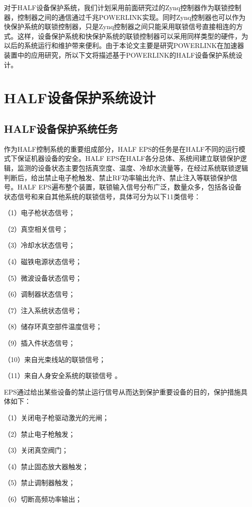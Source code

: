 对于HALF设备保护系统，我们计划采用前面研究过的Zynq控制器作为联锁控制器，控制器之间的通信通过千兆POWERLINK实现。同时Zynq控制器也可以作为快保护系统的联锁控制器，只是Zynq控制器之间只能采用联锁信号直接相连的方式。这样，设备保护系统和快保护系统的联锁控制器可以采用同样类型的硬件，为以后的系统运行和维护带来便利。由于本论文主要是研究POWERLINK在加速器装置中的应用研究，所以下文将描述基于POWERLINK的HALF设备保护系统设计。


\section{HALF设备保护系统设计}

\subsection{HALF设备保护系统任务}

作为HALF控制系统的重要组成部分，HALF EPS的任务是在HALF不同的运行模式下保证机器设备的安全。HALF EPS在HALF各分总体、系统间建立联锁保护逻辑，监测的设备状态主要包括真空度、温度、冷却水流量等，在经过系统联锁逻辑判断后，给出禁止电子枪触发、禁止RF功率输出允许、禁止注入等联锁保护信号。HALF EPS遍布整个装置，联锁输入信号分布广泛，数量众多，包括各设备状态信号和来自其他系统的联锁信号，具体可分为以下11类信号：

（1）电子枪状态信号；

（2）真空相关信号；

（3）冷却水状态信号；

（4）磁铁电源状态信号；

（5）微波设备状态信号；

（6）调制器状态信号；

（7）注入系统状态信号；

（8）储存环真空部件温度信号；

（9）插入件状态信号；

（10）来自光束线站的联锁信号；

（11）来自人身安全系统的联锁信号 。


EPS通过给出某些设备的禁止运行信号从而达到保护重要设备的目的，保护措施具体如下：

（1）关闭电子枪驱动激光的光闸；

（2）禁止电子枪触发；

（3）关闭真空阀门；

（4）禁止固态放大器触发；

（5）禁止调制器触发；

（6）切断高频功率输出；

